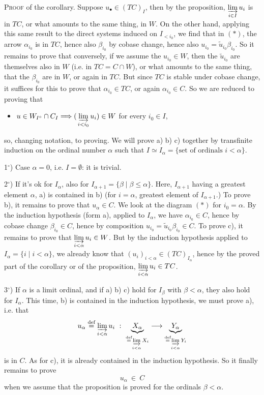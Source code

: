 \documentclass[11pt]{article}
\newcommand{\msp}[1]{\marginpar{\footnotesize [#1]}}
\begin{document}
\textsc{Proof} of the corollary. Suppose $u_\bullet \in (TC)_I$, then by the proposition, $\varinjlim\limits_{i\in I} u_i$ is in $TC$, or what amounts to the same thing, in $W$. On the other hand, applying this same result to the direct systems induced on $I_{<i_0}$, we find that in $(*)$, the arrow $\alpha_{i_0}$ is in $TC$, hence also $\beta_{i_0}$ by cobase change, hence also $u_{i_0} = \tilde{u}_{i_0}\beta_{i_0}$. So it remains to prove that conversely, if we assume the $u_{i_0} \in W$, then the $\tilde{u}_{i_0}$ are themselves also in $W$ (i.e. in $TC = C \cap W$), or what amounts to the same thing, that the $\beta_{i_0}$ are in $W$, or again in $TC$. But since $TC$ is stable under cobase change, it suffices for this to prove that $\alpha_{i_0} \in TC$, or again $\alpha_{i_0} \in C$. So we are reduced to proving that
\begin{itemize}[leftmargin=2.5em]
\item[c)] $u \in W_{I^{\circ}} \cap C_I \Longrightarrow (\,\varinjlim\limits_{i<i_0} u_i) \in W$ for every $i_0 \in I$,
\end{itemize}
so, changing notation, to proving. We will prove a) b) c) together by transfinite induction on the ordinal number $\alpha$ such that $I \simeq I_\alpha = \{\text{set of ordinals } i < \alpha\}$.

\msp{page 4}

1$^\circ$) Case $\alpha = 0$, i.e. $I = \emptyset$: it is trivial.

2$^\circ$) If it's ok for $I_\alpha$, also for $I_{\alpha+1} = \{\beta \mid \beta \leq \alpha\}$. Here, $I_{\alpha+1}$ having a greatest element $\alpha$, a) is contained in b) (for $i = \alpha$, greatest element of $I_{\alpha+1}$.) To prove b), it remains to prove that $u_\alpha \in C$. We look at the diagram $(*)$ for $i_0 = \alpha$. By the induction hypothesis (form a), applied to $I_\alpha$, we have $\alpha_{i_0} \in C$, hence by cobase change $\beta_{i_0} \in C$, hence by composition $u_{i_0} = \tilde{u}_{i_0}\beta_{i_0} \in C$. To prove c), it remains to prove that $\varinjlim\limits_{i<\alpha} u_i \in W$. But by the induction hypothesis applied to $I_\alpha = \{i \mid i < \alpha\}$, we already know that $(u_i)_{i<\alpha} \in (TC)_{I_\alpha}$, hence by the proved part of the corollary or of the proposition, $\varinjlim\limits_{i<\alpha} u_i \in TC$.

3$^\circ$) If $\alpha$ is a limit ordinal, and if a) b) c) hold for $I_\beta$ with $\beta < \alpha$, they also hold for $I_\alpha$. This time, b) is contained in the induction
\msp{page 5}
hypothesis, we must prove a), i.e. that
\[
u_\alpha \overset{\text{def}}{=} \varinjlim_{i<\alpha} u_i \ :\ \underbrace{X_\alpha}_{\overset{\text{def}}{=} \varinjlim\limits_{i<\alpha} X_i} \longrightarrow \underbrace{Y_\alpha}_{\overset{\text{def}}{=} \varinjlim\limits_{i<\alpha} Y_i}
\]
is in $C$. As for c), it is already contained in the induction hypothesis. So it finally remains to prove
\[
u_\alpha \ \in \ C
\]
when we assume that the proposition is proved for the ordinals $\beta < \alpha$.
\end{document}
